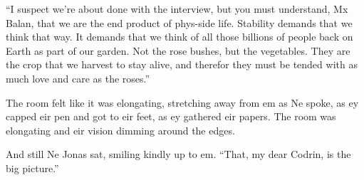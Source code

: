 ``I suspect we're about done with the interview, but you must understand, Mx Balan, that we are the end product of phys-side life. Stability demands that we think that way. It demands that we think of all those billions of people back on Earth as part of our garden. Not the rose bushes, but the vegetables. They are the crop that we harvest to stay alive, and therefor they must be tended with as much love and care as the roses.''

The room felt like it was elongating, stretching away from em as Ne spoke, as ey capped eir pen and got to eir feet, as ey gathered eir papers. The room was elongating and eir vision dimming around the edges.

And still Ne Jonas sat, smiling kindly up to em. ``That, my dear Codrin, is the big picture.''
